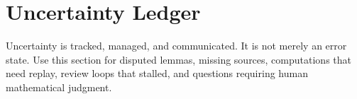 \section{Uncertainty Ledger}

Uncertainty is tracked, managed, and communicated. It is not merely an error state.
Use this section for disputed lemmas, missing sources, computations that need replay,
review loops that stalled, and questions requiring human mathematical judgment.

\begin{claimledger}
\end{claimledger}
